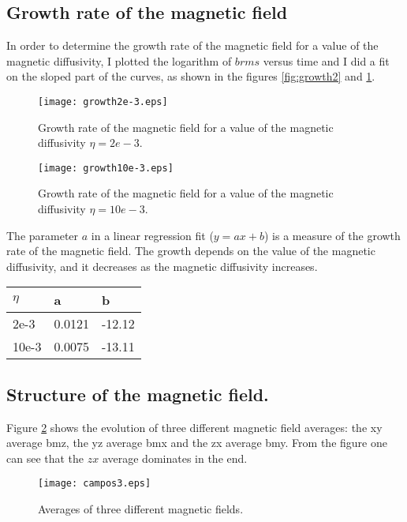 \subsection{Growth rate of the magnetic field}

In order to determine the growth rate of the magnetic field for a value of the magnetic diffusivity, I plotted the logarithm of $brms$ versus time and I did a fit on the sloped part of the curves, as shown in the figures \ref{fig:growth2} and \ref{fig:growth10}.

\begin{figure}[h]
\begin{minipage}[t]{.45\textwidth}
\centering
\texttt{[image: growth2e-3.eps]}
\caption{Growth rate of the magnetic field for a value of the magnetic diffusivity  $\eta = 2e-3$.}
\label{fig:growth2}
\end{minipage}
\hspace{0.5cm}
\begin{minipage}[t]{.45\textwidth}
\centering
 \texttt{[image: growth10e-3.eps]}
\caption{Growth rate of the magnetic field for a value of the magnetic diffusivity  $\eta = 10e-3$.}
\label{fig:growth10}
\end{minipage}
 \end{figure}
The parameter $a$ in a linear regression fit ($y=ax+b$) is a measure of the growth rate of the magnetic field. The growth depends on the value of the magnetic diffusivity, and it decreases as the magnetic diffusivity increases.
\begin{center}
\begin{tabular}{lll}
$\eta$ & a & b\\\hline
2e-3 & 0.0121 & -12.12\\
10e-3 & 0.0075 & -13.11
\end{tabular}
\end{center}

\subsection{Structure of the magnetic field.}

Figure \ref{fig:averages} shows the evolution of three different magnetic field averages: the xy average bmz, the yz average bmx and the zx average bmy. 
From the figure one can see that the $zx$ average dominates in the end.
\begin{figure}[h]
\centering
\texttt{[image: campos3.eps]}
\caption{Averages of three different magnetic fields.}
\label{fig:averages}
 \end{figure}

